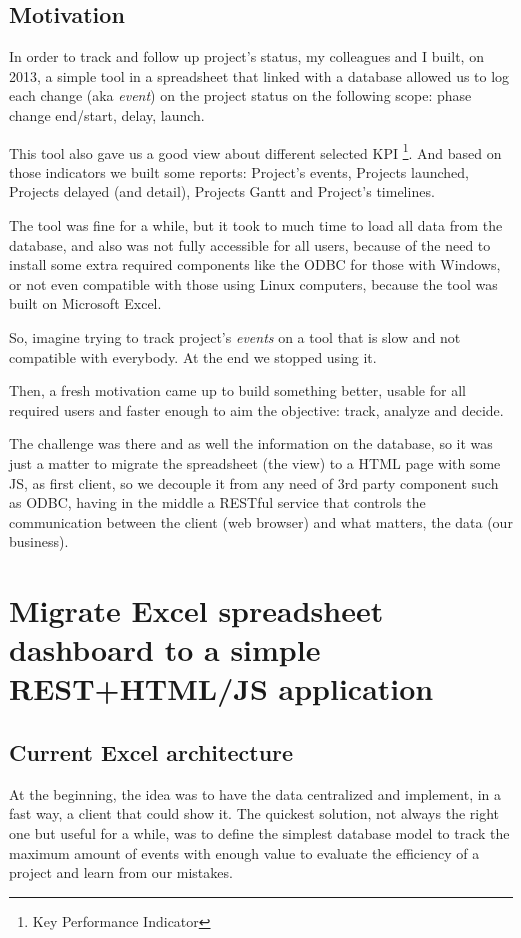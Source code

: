 \chapter*{Motivation}
In order to track and follow up project's status, my colleagues and I
built, on 2013, a simple tool in a spreadsheet that linked with a database
allowed us to log each change (aka \emph{event}) on the project status on the following scope: phase change
end/start, delay, launch.

This tool also gave us a good view about different selected KPI \footnote{Key
Performance Indicator}. And based on those indicators we built some reports:
Project's events, Projects launched, Projects delayed (and detail), Projects
Gantt and Project's timelines.

The tool was fine for a while, but it took to much time to load all data
from the database, and also was not fully accessible for all users, because
of the need to install some extra required components like the ODBC for those with
Windows, or not even compatible with those using Linux computers, because the
tool was built on Microsoft Excel.

So, imagine trying to track project's \emph{events} on a tool that is slow
and not compatible with everybody. At the end we stopped using it.

Then, a fresh motivation came up to build something better,
usable for all required users and faster enough to aim the objective: track,
analyze and decide. 

The challenge was there and as well the information on the database, so it was
just a matter to migrate the spreadsheet (the view) to a HTML page with some JS,
as first client, so we decouple it from any need of 3rd party component such as
ODBC, having in the middle a RESTful service that
controls the communication between the client (web browser) and what matters,
the data (our business).

\part{Migrate Excel spreadsheet dashboard to a simple REST+HTML/JS
application}
\label{c_phaseone}

\chapter{Current Excel architecture}
At the beginning, the idea was to have the data centralized
\label{t_main_objective} and implement, in a fast way, a client that could show
it. The quickest solution, not always the right one but useful for a while, was
to define the simplest database model to  track the maximum amount of events
with enough value to evaluate the  efficiency of a project and learn from our
mistakes.


